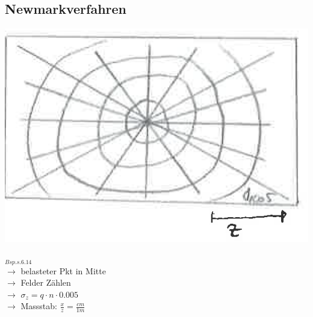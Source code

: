 \begin{minipage}{0.2\linewidth}
		\vspace{\baselineskip}
\subsection{Newmarkverfahren}
	\includegraphics[width=\linewidth]{images/SpimBoden3Newmark.PNG}
\end{minipage}
\begin{minipage}{0.5\linewidth}
	\bigskip
	\vspace{\baselineskip}
		$_{Bsp. s. 6.14}$ \\
		$\rightarrow$ belasteter Pkt in Mitte \\ 
		$\rightarrow$ Felder Zählen \\
		$\rightarrow$ $\sigma_z=q \cdot n \cdot 0.005$ \\
		$\rightarrow$ Massstab: $\frac{x}{z} = \frac{cm}{1m}$ \\
\end{minipage}




%		
%	
